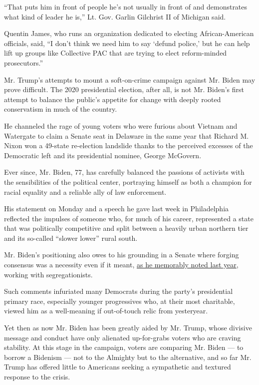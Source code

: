 ``That puts him in front of people he's not usually in front of and
demonstrates what kind of leader he is,'' Lt. Gov. Garlin Gilchrist II
of Michigan said.

Quentin James, who runs an organization dedicated to electing
African-American officials, said, ``I don't think we need him to say
`defund police,' but he can help lift up groups like Collective PAC that
are trying to elect reform-minded prosecutors.''

Mr. Trump's attempts to mount a soft-on-crime campaign against Mr. Biden
may prove difficult. The 2020 presidential election, after all, is not
Mr. Biden's first attempt to balance the public's appetite for change
with deeply rooted conservatism in much of the country.

He channeled the rage of young voters who were furious about Vietnam and
Watergate to claim a Senate seat in Delaware in the same year that
Richard M. Nixon won a 49-state re-election landslide thanks to the
perceived excesses of the Democratic left and its presidential nominee,
George McGovern.

Ever since, Mr. Biden, 77, has carefully balanced the passions of
activists with the sensibilities of the political center, portraying
himself as both a champion for racial equality and a reliable ally of
law enforcement.

His statement on Monday and a speech he gave last week in Philadelphia
reflected the impulses of someone who, for much of his career,
represented a state that was politically competitive and split between a
heavily urban northern tier and its so-called ``slower lower'' rural
south.

Mr. Biden's positioning also owes to his grounding in a Senate where
forging consensus was a necessity even if it meant,
\href{https://www.nytimes3xbfgragh.onion/2019/06/19/us/politics/biden-segregationists.html}{as
he memorably noted last year}, working with segregationists.

Such comments infuriated many Democrats during the party's presidential
primary race, especially younger progressives who, at their most
charitable, viewed him as a well-meaning if out-of-touch relic from
yesteryear.

Yet then as now Mr. Biden has been greatly aided by Mr. Trump, whose
divisive message and conduct have only alienated up-for-grabs voters who
are craving stability. At this stage in the campaign, voters are
comparing Mr. Biden --- to borrow a Bidenism --- not to the Almighty but
to the alternative, and so far Mr. Trump has offered little to Americans
seeking a sympathetic and textured response to the crisis.

